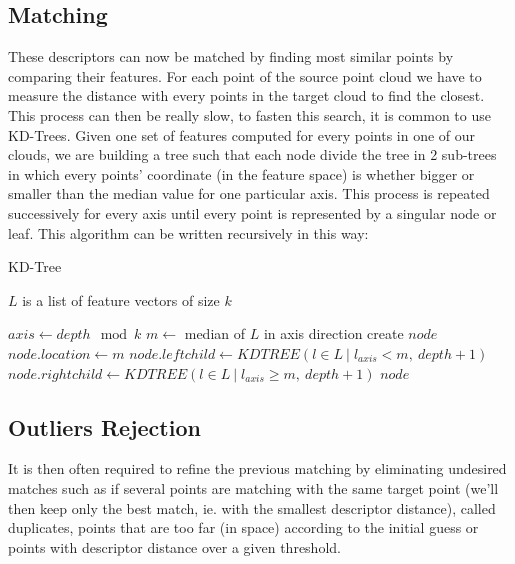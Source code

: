 \subsection{Matching}

    These descriptors can now be matched by finding most similar points by comparing their features. For each point of the source point cloud we have to measure the distance with every points in the target cloud to find the closest. \\
    This process can then be really slow, to fasten this search, it is common to use KD-Trees. Given one set of features computed for every points in one of our clouds, we are building a tree such that each node divide the tree in 2 sub-trees in which every points' coordinate (in the feature space) is whether bigger or smaller than the median value for one particular axis. This process is repeated successively for every axis until every point is represented by a singular node or leaf. This algorithm can be written recursively in this way:
    
    \begin{algorithm}
        \caption{KD-Tree}\label{alg:kdtree}
        \REQUIRE $L$ is a list of feature vectors of size $k$
        \begin{algorithmic}[1]
                \State $axis \longleftarrow depth \mod{k}$
                \State $m \longleftarrow $ median of $L$ in axis direction
                \State create $node$
                \State $node.location \longleftarrow m$
                \State $node.leftchild \longleftarrow KDTREE({l \in L \:\vert\; l_{axis} < m}, \:depth + 1)$
                \State $node.rightchild \longleftarrow KDTREE({l \in L \:\vert\; l_{axis} \geq m}, \:depth + 1)$
                \State \Return $node$
            \EndFunction
        \end{algorithmic}
    \end{algorithm}
    
    
\subsection{Outliers Rejection} 

    It is then often required to refine the previous matching by eliminating undesired matches such as if several points are matching with the same target point (we'll then keep only the best match, ie. with the smallest descriptor distance), called duplicates, points that are too far (in space) according to the initial guess or points with descriptor distance over a given threshold.
    
